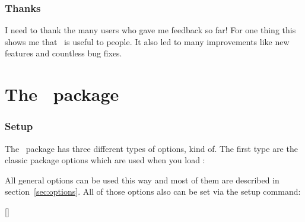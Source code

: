 \documentclass[load-preamble+]{cnltx-doc}
\begin{document}



\section{Thanks}
I need to thank the many users who gave me feedback so far!  For one thing
this shows me that \ExSheets\ is useful to people.  It also led to many
improvements like new features and countless bug fixes.

\part{The \ExSheets\ package}\label{part:exsheets}
\section{Setup}
The \ExSheets\ package has three different types of options, kind of.  The
first type are the classic package options which are used when you load
\ExSheets:
\begin{sourcecode}
  \usepackage[<options>]{exsheets}
\end{sourcecode}
All general options can be used this way and most of them are described in
section~\ref{sec:options}.  All of those options also can be set via the setup
command:
\begin{commands}
  []
\end{commands}
\end{document}
